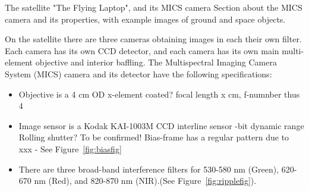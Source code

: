\documentclass[final,hyperref={pdfpagelabels=false}]{beamer}
\begin{document}
\begin{frame}[t]
\begin{columns}[t]
\begin{column}{.23\textwidth}
\begin{block}{The satellite "The Flying Laptop", and its MICS camera}
Section about the MICS camera and its properties, with example images of ground and space objects.

On the satellite there are three cameras obtaining images in each their own filter. Each camera has its own CCD detector, and each camera has its own main multi-element objective and interior baffling.
The Multispectral Imaging Camera System (MICS) camera and its detector have the following specifications:
\begin{itemize}
    \item Objective is a 4 cm OD x-element
    \subitem coated?
    \subitem focal length x cm, f-numnber thus 4
    \item Image sensor is a Kodak KAI-1003M CCD interline sensor 
    -bit dynamic range
    \subitem Rolling shutter? To be confirmed!
    \subitem Bias-frame has a regular pattern due to xxx - See Figure~\ref{fig:biasfig}
    \item There are three broad-band interference filters for 530-580 nm (Green), 620-670 nm (Red), and 820-870 nm (NIR).(See Figure~\ref{fig:ripplefig}).
\end{itemize}


\end{block}
\end{column}
\end{columns}
\end{frame}
\end{document}
